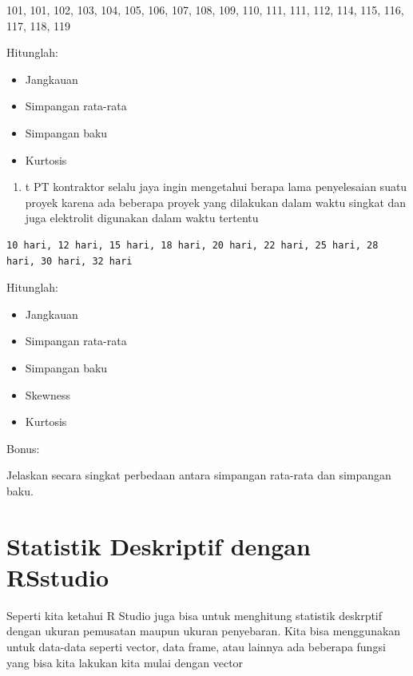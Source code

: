 \documentclass[
]{book}
\providecommand{\tightlist}{%
  \setlength{\itemsep}{0pt}\setlength{\parskip}{0pt}}
\theoremstyle{definition}
\theoremstyle{definition}
\theoremstyle{definition}
\theoremstyle{definition}
\theoremstyle{remark}
\begin{document}
101, 101, 102, 103, 104, 105, 106, 107, 108, 109, 110, 111, 111, 112, 114, 115, 116, 117, 118, 119

Hitunglah:

\begin{itemize}
\tightlist
\item
  Jangkauan
\item
  Simpangan rata-rata
\item
  Simpangan baku
\item
  Kurtosis
\end{itemize}

\begin{enumerate}
\def\labelenumi{\arabic{enumi}.}
\setcounter{enumi}{4}
\tightlist
\item
  t PT kontraktor selalu jaya ingin mengetahui berapa lama penyelesaian suatu proyek karena ada beberapa proyek yang dilakukan dalam waktu singkat dan juga elektrolit digunakan dalam waktu tertentu
\end{enumerate}

\begin{verbatim}
10 hari, 12 hari, 15 hari, 18 hari, 20 hari, 22 hari, 25 hari, 28 hari, 30 hari, 32 hari
\end{verbatim}

Hitunglah:

\begin{itemize}
\tightlist
\item
  Jangkauan
\item
  Simpangan rata-rata
\item
  Simpangan baku
\item
  Skewness
\item
  Kurtosis
\end{itemize}

Bonus:

Jelaskan secara singkat perbedaan antara simpangan rata-rata dan simpangan baku.

\hypertarget{statistik-deskriptif-dengan-rsstudio}{%
\chapter{Statistik Deskriptif dengan RSstudio}\label{statistik-deskriptif-dengan-rsstudio}}

Seperti kita ketahui R Studio juga bisa untuk menghitung statistik deskrptif dengan ukuran pemusatan maupun ukuran penyebaran. Kita bisa menggunakan untuk data-data seperti vector, data frame, atau lainnya ada beberapa fungsi yang bisa kita lakukan kita mulai dengan vector
\end{document}
